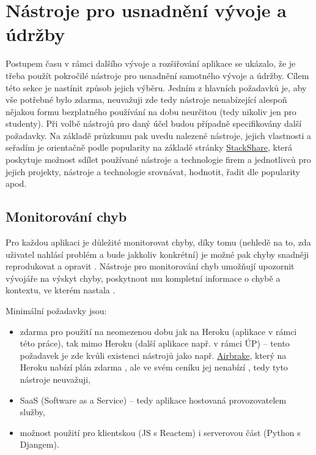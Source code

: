 \chapter{Nástroje pro usnadnění vývoje a údržby}

Postupem času v rámci dalšího vývoje a rozšiřování aplikace se ukázalo, že je třeba použít pokročilé nástroje pro usnadnění samotného vývoje a údržby. Cílem této sekce je nastínit způsob jejich výběru. Jedním z hlavních požadavků je, aby vše potřebné bylo zdarma, neuvažuji zde tedy nástroje nenabízející alespoň nějakou formu bezplatného používání na dobu neurčitou (tedy nikoliv jen pro studenty). Při volbě nástrojů pro daný účel budou případně specifikovány další požadavky. Na základě průzkumu pak uvedu nalezené nástroje, jejich vlastnosti a seřadím je orientačně podle popularity na základě stránky \href{https://stackshare.io/}{StackShare}, která poskytuje \cite{stackshare} možnost sdílet používané nástroje a technologie firem a jednotlivců pro jejich projekty, nástroje a technologie srovnávat, hodnotit, řadit dle popularity apod.

\section{Monitorování chyb}
Pro každou aplikaci je důležité monitorovat chyby, díky tomu (nehledě na to, zda uživatel nahlásí problém a bude jakkoliv konkrétní) je možné pak chyby snadněji reprodukovat a opravit \cite{tools-exception}. Nástroje pro monitorování chyb umožňují upozornit vývojáře na výskyt chyby, poskytnout mu kompletní informace o chybě a kontextu, ve kterém nastala  \cite{tools-exception}.

Minimální požadavky jsou:
\begin{itemize}
    \item zdarma pro použití na neomezenou dobu jak na Heroku (aplikace v rámci této práce), tak mimo Heroku (další aplikace např. v rámci ÚP) -- tento požadavek je zde kvůli existenci nástrojů jako např. \href{https://airbrake.io/}{Airbrake}, který na Heroku nabízí plán zdarma \cite{airbrake-heroku}, ale ve svém ceníku jej nenabízí \cite{airbrake-pricing}, tedy tyto nástroje neuvažuji,
    \item SaaS (Software as a Service) -- tedy aplikace hostovaná provozovatelem služby,
    \item možnost použití pro klientskou (JS s Reactem) i serverovou část (Python s Djangem).
\end{itemize}

